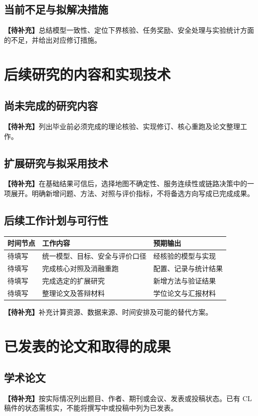\documentclass[UTF8,a4paper,12pt,fontset=fandol]{ctexart}
\newcommand{\pending}[1]{\par\noindent\textbf{【待补充】}#1\par}
\begin{document}
\subsection{当前不足与拟解决措施}
\pending{总结模型一致性、定位下界核验、任务奖励、安全处理与实验统计方面的不足，并给出对应修订措施。}

\section{后续研究的内容和实现技术}

\subsection{尚未完成的研究内容}
\pending{列出毕业前必须完成的理论核验、实现修订、核心重跑及论文整理工作。}

\subsection{扩展研究与拟采用技术}
\pending{在基础结果可信后，选择地图不确定性、服务连续性或链路决策中的一项展开。明确新增问题、方法、对照与评价指标，不将备选方向写成已完成成果。}

\subsection{后续工作计划与可行性}
\begin{center}
  \renewcommand{\arraystretch}{1.35}
  \begin{tabularx}{\textwidth}{p{2.8cm}XX}
    \toprule
    时间节点 & 工作内容 & 预期输出 \\
    \midrule
    待填写 & 统一模型、目标、安全与评价口径 & 经核验的模型与实现 \\
    待填写 & 完成核心对照及消融重跑 & 配置、记录与统计结果 \\
    待填写 & 完成选定的扩展研究 & 新增方法与验证结果 \\
    待填写 & 整理论文及答辩材料 & 学位论文与汇报材料 \\
    \bottomrule
  \end{tabularx}
\end{center}
\pending{补充计算资源、数据来源、时间安排及可能的替代方案。}

\section{已发表的论文和取得的成果}

\subsection{学术论文}
\pending{按实际情况列出题目、作者、期刊或会议、发表或投稿状态。已有 CL 稿件的状态需核实，不能将撰写中或投稿中列为已发表。}
\end{document}
